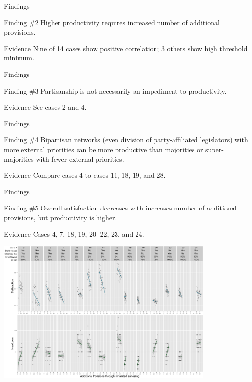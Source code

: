 \documentclass[14pt]{beamer}
\begin{document}
\begin{frame}{Findings}
\begin{block}{Finding \#2}
  Higher productivity requires increased number of additional provisions.
\end{block}
\begin{block} {Evidence}
  Nine of 14 cases show positive correlation; 3 others show high threshold minimum.
\end{block}
\end{frame}
 
 
\begin{frame}{Findings}
\begin{block}{Finding  \#3}
  Partisanship is not necessarily an impediment to productivity.   
\end{block}
\begin{block}{Evidence}
  See cases 2 and 4.
\end{block}
\end{frame}


\begin{frame}{Findings}
\begin{block}{Finding  \#4}
  Bipartisan networks (even division of party-affiliated legislators) with more external priorities can be more productive than majorities or super-majorities with fewer external priorities.
\end{block}
\begin{block}{Evidence}
  Compare cases 4 to cases 11, 18, 19, and 28.
\end{block}
\end{frame}

\begin{frame}{Findings}
\begin{block}{Finding \#5}
  Overall satisfaction decreases with increases number of additional provisions, but productivity is higher.  
\end{block}
\begin{block}{Evidence}
  Cases 4, 7, 18, 19, 20, 22, 23, and 24. 
\end{block}
\end{frame}

\begin{frame}
 \includegraphics[width=10.8cm]{combinedResults_newColors.png}
\end{frame}
\end{document}
